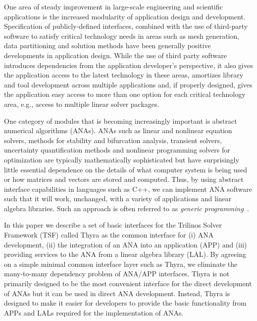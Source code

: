 \documentclass[pdf,ps2pdf,11pt]{SANDreport}
\begin{document}
One area of steady improvement in large-scale engineering and
scientific applications is the increased modularity of application
design and development.  Specification of publicly-defined interfaces,
combined with the use of third-party software to satisfy critical
technology needs in areas such as mesh generation, data partitioning
and solution methods have been generally positive developments in
application design.  While the use of third party software introduces
dependencies from the application developer's perspective, it also
gives the application access to the latest technology in these areas,
amortizes library and tool development across multiple applications
and, if properly designed, gives the application easy access to more
than one option for each critical technology area, e.g., access to
multiple linear solver packages.

One category of modules that is becoming increasingly important is
abstract numerical algorithms (ANAs).  ANAs such as linear and
nonlinear equation solvers, methods for stability and bifurcation
analysis, transient solvers, uncertainty quantification methods and
nonlinear programming solvers for optimization are typically
mathematically sophisticated but have surprisingly little essential
dependence on the details of what computer system is being used or how
matrices and vectors are stored and computed.  Thus, by using abstract
interface capabilities in languages such as C++, we can implement ANA
software such that it will work, unchanged, with a variety of
applications and linear algebra libraries.  Such an approach is often
referred to as {\it generic
programming}~\cite{ref:boost_generic_programming}.

In this paper we describe a set of basic interfaces for the Trilinos
Solver Framework (TSF) called Thyra as the common interface for (i)
ANA development, (ii) the integration of an ANA into an application
(APP) and (iii) providing services to the ANA from a linear algebra
library (LAL).  By agreeing on a simple minimal common interface layer
such as Thyra, we eliminate the many-to-many dependency problem of
ANA/APP interfaces.  Thyra is not primarily designed to be the most
convenient interface for the direct development of ANAs but it can be
used in direct ANA development.  Instead, Thyra is designed to make
it easier for developers to provide the basic functionality from APPs
and LALs required for the implementation of ANAs.
\end{document}
